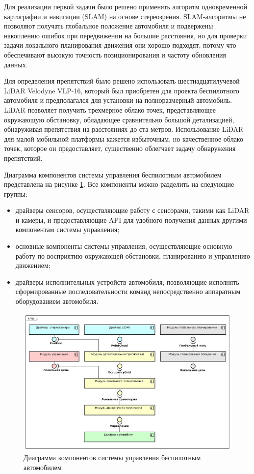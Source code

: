 Для реализации первой задачи было решено применять алгоритм одновременной картографии и навигации (SLAM) на основе
стереозрения. SLAM-алгоритмы не позволяют получать глобальное положение автомобиля и подвержены накоплению ошибок при
передвижении на большие расстояния, но для проверки задачи локального планирования движения они хорошо подходят, потому
что обеспечивают высокую точность позиционирования и частоту обновления данных.

Для определения препятствий было решено использовать шестнадцатилучевой LiDAR Velodyne VLP-16, который был приобретен
для проекта беспилотного автомобиля и предполагался для установки на полноразмерный автомобиль. LiDAR позволяет получить
трехмерное облако точек, представляющее окружающую обстановку, обладающее сравнительно большой детализацией, обнаруживая
препятствия на расстояниях до ста метров. Использование LiDAR для малой мобильной платформы кажется избыточным, но
качественное облако точек, которое он предоставляет, существенно облегчает задачу обнаружения препятствий.

Диаграмма компонентов системы управления беспилотным автомобилем представлена на рисунке
\ref{img:system_component_diagram}. Все компоненты можно разделить на следующие группы:
\begin{itemize}
      \item драйверы сенсоров, осуществляющие работу с сенсорами, такими как LiDAR и камеры, и предоставляющие
            API для удобного получения данных другими компонентам системы управления;
      \item основные компоненты системы управления, осуществляющие основную работу по восприятию окружающей
            обстановки, планированию и управлению движением;
      \item драйверы исполнительных устройств автомобиля, позволяющие исполнять сформированные последовательности
            команд непосредственно аппаратным оборудованием автомобиля.
\end{itemize}

\begin{figure}[h]
      \centering
      \includegraphics[width=\linewidth]{images/system_component_diagram}
      \caption{Диаграмма компонентов системы управления беспилотным автомобилем}
      \label{img:system_component_diagram}
  \end{figure}

